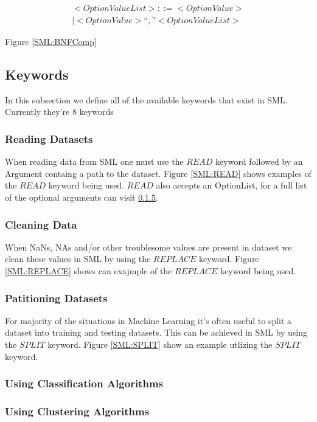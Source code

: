 \documentclass[jair,twoside,11pt,theapa]{article}
\begin{document}
\begin{equation} \label{BNF:OptionValueList}
\begin{split}
<Option Value List> ::= <Option Value> \\
| <Option Value> “,” <Option Value List>
\end{split}
\end{equation}

Figure \ref{SML:BNFComp} %

\subsection{Keywords}
In this subsection we define all of the available keywords that exist in SML. Currently they're 8 keywords

\subsubsection{Reading Datasets}
When reading data from SML one must use the \(READ\) keyword followed by an Argument containg a path to the dataset. Figure \ref{SML:READ} shows examples of the \(READ\) keyword being used. \(READ\) also accepts an OptionList, for a full list of the optional arguments can visit \ref{}.

\subsubsection{Cleaning Data}
When NaNs, NAs and/or other troublesome values are present in dataset we clean these values in SML by using the \(REPLACE\) keyword. Figure \ref{SML:REPLACE} shows can exajmple of the \(REPLACE\) keyword being used.  

\subsubsection{Patitioning Datasets}
For majority of the situations in Machine Learning it's often useful to split a dataset into training and testing datasets. This can be achieved in SML by using the \(SPLIT\) keyword. Figure \ref{SML:SPLIT} show an example utlizing the \(SPLIT\) keyword.

\subsubsection{Using Classification Algorithms}


\subsubsection{Using Clustering Algorithms}
\end{document}
